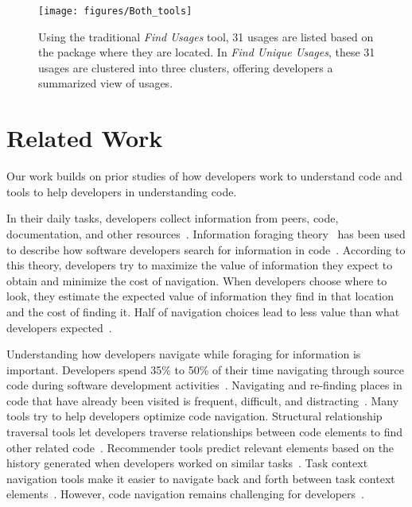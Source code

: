 \documentclass[conference]{IEEEtran}
\begin{document}
\begin{figure}
    \centering
    \texttt{[image: figures/Both\_tools]}
    \caption{Using the traditional \textit{Find Usages} tool, 31 usages are listed based on the package where they are located. In \textit{Find Unique Usages}, these 31 usages are clustered into three clusters, offering developers a summarized view of usages.}
\label{fig:compare}
\end{figure}
\section{Related Work}
Our work builds on prior studies of how developers work to understand code and tools to help developers in understanding code.

In their daily tasks, developers collect information from peers, code, documentation, and other resources~\cite{latoza2006maintaining}. Information foraging theory~\cite{pirolli1999informationforaging} has been used to describe how software developers search for information in code~\cite{fleming2013information}. According to this theory, developers try to maximize the value of information they expect to obtain and minimize the cost of navigation. When developers choose where to look, they estimate the expected value of information they find in that location and the cost of finding it. Half of navigation choices lead to less value than what developers expected~\cite{piorkowski2016foraging}. \par

Understanding how developers navigate while foraging for information is important. Developers spend 35\% to 50\% of their time navigating through source code during software development activities~\cite{ko2006exploratory,piorkowski2013whats}. Navigating and re-finding places in code that have already been visited is frequent, difficult, and distracting~\cite{ko2005eliciting,deline2005towards}. Many tools try to help developers optimize code navigation. Structural relationship traversal tools let developers traverse relationships between code elements to find other related code~\cite{karrer2011stacksplorer,augustine2015field,latoza2011visualizing}. Recommender tools predict relevant elements based on the history generated when developers worked on similar tasks~\cite{zimmermann2005mining,deline2005easing}. Task context navigation tools make it easier to navigate back and forth between task context elements~\cite{ko2006exploratory}. However, code navigation remains challenging for developers~\cite{albusays2017interviews}.\par
\end{document}
